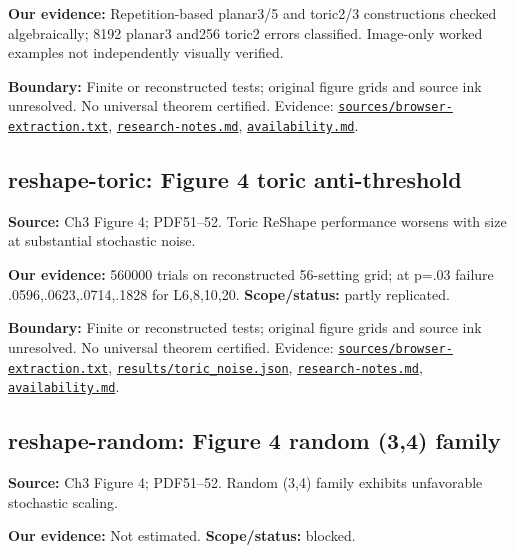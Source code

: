\documentclass[11pt]{article}
\begin{document}
\textbf{Our evidence:} Repetition-based planar3/5 and toric2/3 constructions checked algebraically; 8192 planar3 and256 toric2 errors classified. Image-only worked examples not independently visually verified.

\textbf{Boundary:} Finite or reconstructed tests; original figure grids and source ink unresolved. No universal theorem certified. Evidence: \href{https://github.com/alectionary/vibe-math/blob/master/formalization/quintavalle-hgp/sources/browser-extraction.txt}{\nolinkurl{sources/browser-extraction.txt}}, \href{https://github.com/alectionary/vibe-math/blob/master/formalization/quintavalle-hgp/research-notes.md}{\nolinkurl{research-notes.md}}, \href{https://github.com/alectionary/vibe-math/blob/master/formalization/quintavalle-hgp/availability.md}{\nolinkurl{availability.md}}.
\subsection{reshape-toric: Figure 4 toric anti-threshold}
\label{claim:reshape-toric}
\textbf{Source:} Ch3 Figure 4; PDF51--52. Toric ReShape performance worsens with size at substantial stochastic noise.

\textbf{Our evidence:} 560000 trials on reconstructed 56-setting grid; at p=.03 failure .0596,.0623,.0714,.1828 for L6,8,10,20. \textbf{Scope/status:} partly replicated.

\textbf{Boundary:} Finite or reconstructed tests; original figure grids and source ink unresolved. No universal theorem certified. Evidence: \href{https://github.com/alectionary/vibe-math/blob/master/formalization/quintavalle-hgp/sources/browser-extraction.txt}{\nolinkurl{sources/browser-extraction.txt}}, \href{https://github.com/alectionary/vibe-math/blob/master/formalization/quintavalle-hgp/results/toric_noise.json}{\nolinkurl{results/toric_noise.json}}, \href{https://github.com/alectionary/vibe-math/blob/master/formalization/quintavalle-hgp/research-notes.md}{\nolinkurl{research-notes.md}}, \href{https://github.com/alectionary/vibe-math/blob/master/formalization/quintavalle-hgp/availability.md}{\nolinkurl{availability.md}}.
\subsection{reshape-random: Figure 4 random (3,4) family}
\label{claim:reshape-random}
\textbf{Source:} Ch3 Figure 4; PDF51--52. Random (3,4) family exhibits unfavorable stochastic scaling.

\textbf{Our evidence:} Not estimated. \textbf{Scope/status:} blocked.
\end{document}
